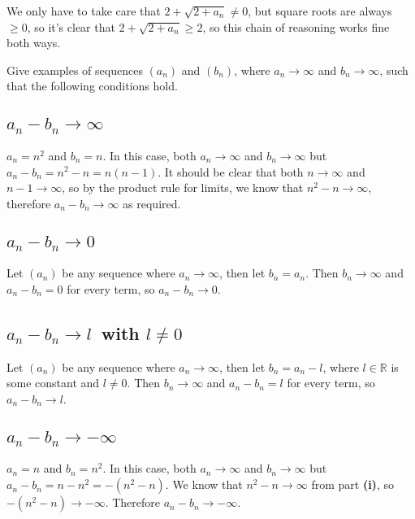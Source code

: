 \documentclass[a4paper]{article}
\begin{document}
We only have to take care that $2 + \sqrt{2 + a_n} \ne 0$, but square roots are always $\ge 0$, so it's clear that $2 + \sqrt{2 + a_n} \ge 2$, so this chain of reasoning works fine both ways.


\begin{questionbody}
Give examples of sequences $(a_n)$ and $(b_n)$, where $a_n \to \infty$ and $b_n \to \infty$, such that the following conditions hold.
\end{questionbody}

\subsection{$a_n - b_n \to \infty$}

$a_n = n^2$ and $b_n = n$. In this case, both $a_n \to \infty$ and $b_n \to \infty$ but $a_n - b_n = n^2 - n = n (n-1)$. It should be clear that both $n \to \infty$ and $n-1 \to \infty$, so by the product rule for limits, we know that $n^2 - n \to \infty$, therefore $a_n - b_n \to \infty$ as required.

\subsection{$a_n - b_n \to 0$}

Let $(a_n)$ be any sequence where $a_n \to \infty$, then let $b_n = a_n$. Then $b_n \to \infty$ and $a_n - b_n = 0$ for every term, so $a_n - b_n \to 0$.

\subsection{$a_n - b_n \to l$\normalfont\ with $l \ne 0$}

Let $(a_n)$ be any sequence where $a_n \to \infty$, then let $b_n = a_n - l$, where $l \in \mathbb R$ is some constant and $l \ne 0$. Then $b_n \to \infty$ and $a_n - b_n = l$ for every term, so $a_n - b_n \to l$.

\subsection{$a_n - b_n \to -\infty$}

$a_n = n$ and $b_n = n^2$. In this case, both $a_n \to \infty$ and $b_n \to \infty$ but $a_n - b_n = n - n^2 = -(n^2 - n)$. We know that $n^2 - n \to \infty$ from part \textbf{(i)}, so $-(n^2 - n) \to -\infty$. Therefore $a_n - b_n \to -\infty$.
\end{document}
